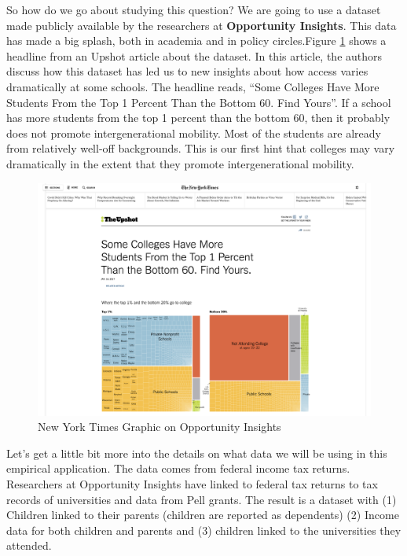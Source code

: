 \documentclass[
]{book}
\begin{document}
So how do we go about studying this question? We are going to use a dataset made publicly available by the researchers at \textbf{Opportunity Insights}. This data has made a big splash, both in academia and in policy circles.Figure \ref{fig:oi} shows a headline from an Upshot article about the dataset. In this article, the authors discuss how this dataset has led us to new insights about how access varies dramatically at some schools. The headline reads, ``Some Colleges Have More Students From the Top 1 Percent Than the Bottom 60. Find Yours''. If a school has more students from the top 1 percent than the bottom 60, then it probably does not promote intergenerational mobility. Most of the students are already from relatively well-off backgrounds. This is our first hint that colleges may vary dramatically in the extent that they promote intergenerational mobility.

\begin{figure}

{\centering \includegraphics[width=1\linewidth]{images/02_oi} 

}

\caption{New York Times Graphic on Opportunity Insights}\label{fig:oi}
\end{figure}

Let's get a little bit more into the details on what data we will be using in this empirical application. The data comes from federal income tax returns. Researchers at Opportunity Insights have linked to federal tax returns to tax records of universities and data from Pell grants. The result is a dataset with (1) Children linked to their parents (children are reported as dependents) (2) Income data for both children and parents and (3) children linked to the universities they attended.
\end{document}
